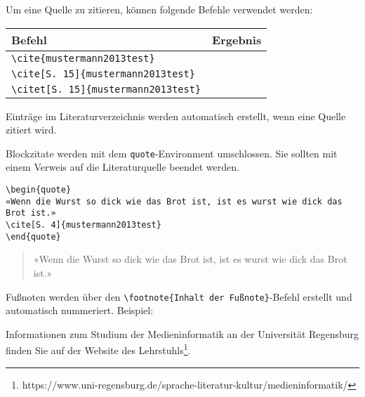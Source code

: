 Um eine Quelle zu zitieren, können folgende Befehle verwendet werden:

\bigskip

\begin{tabular}{@{}ll@{}}
\hline
\textbf{Befehl} & \textbf{Ergebnis} \\
\hline
    \verb|\cite{mustermann2013test}| & \cite{mustermann2013test} \\
    \verb|\cite[S. 15]{mustermann2013test}| & \cite[S. 15]{mustermann2013test} \\
    \verb|\citet[S. 15]{mustermann2013test}| & \citet[S. 15]{mustermann2013test} \\
\hline
\end{tabular}

\bigskip

Einträge im Literaturverzeichnis werden automatisch erstellt, wenn eine Quelle zitiert wird.


Blockzitate werden mit dem \verb|quote|-Environment umschlossen.
Sie sollten mit einem Verweis auf die Literaturquelle beendet werden.

\begin{verbatim}
\begin{quote}
«Wenn die Wurst so dick wie das Brot ist, ist es wurst wie dick das Brot ist.»
\cite[S. 4]{mustermann2013test}
\end{quote}
\end{verbatim}

\begin{quote}
«Wenn die Wurst so dick wie das Brot ist, ist es wurst wie dick das Brot ist.»
\cite[S. 4]{mustermann2013test}
\end{quote}


Fußnoten werden über den \verb|\footnote{Inhalt der Fußnote}|-Befehl erstellt und automatisch nummeriert. Beispiel:

Informationen zum Studium der Medieninformatik an der Universität Regensburg finden Sie auf der Website des Lehrstuhls\footnote{https://www.uni-regensburg.de/sprache-literatur-kultur/medieninformatik/}.

